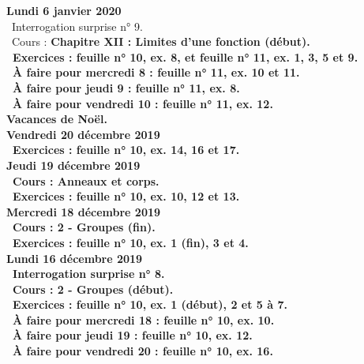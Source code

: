 \documentclass[12pt,a4paper]{article}
\begin{document}
\noindent\textbf{Lundi 6 janvier 2020} \\
\bu\ Interrogation surprise n° 9.\\
\bu\ Cours : \bf Chapitre XII \rm : Limites d'une fonction (début).\\ 
\bu\ Exercices : feuille n° 10, ex. 8, et feuille n° 11, ex. 1, 3, 5 et 9.\\
\bu\ À faire pour mercredi 8 : feuille n° 11, ex. 10 et 11.\\
\bu\ À faire pour jeudi 9 : feuille n° 11, ex. 8.\\
\bu\ À faire pour vendredi 10 : feuille n° 11, ex. 12.\vspace{.4cm}\\ 

\noindent\textbf{\bf Vacances de Noël}.\vspace{.4cm}\\

\noindent\textbf{Vendredi 20 décembre 2019}\\
\bu\ Exercices : feuille n° 10, ex. 14, 16 et 17.\vspace{.4cm}\\

 \noindent\textbf{Jeudi 19 décembre 2019}\\
\bu\ Cours : Anneaux et corps.\\ 
\bu\ Exercices : feuille n° 10, ex. 10, 12 et 13.\vspace{.4cm}\\
  
\noindent\textbf{\bf Mercredi 18 décembre 2019}\\
\bu\ Cours : 2 - Groupes (fin).\\ 
\bu\ Exercices : feuille n° 10, ex. 1 (fin), 3 et 4.\vspace{.4cm}\\
 
\noindent\textbf{Lundi 16 décembre 2019}\\
\bu\ Interrogation surprise n° 8.\\
\bu\ Cours : 2 - Groupes (début).\\ 
\bu\ Exercices : feuille n° 10, ex. 1 (début), 2 et 5 à 7.\\
\bu\ À faire pour mercredi 18 : feuille n° 10, ex. 10.\\
\bu\ À faire pour jeudi 19 : feuille n° 10, ex. 12.\\
\bu\ À faire pour vendredi 20 : feuille n° 10, ex. 16.\vspace{.4cm}\\ 
\end{document}
